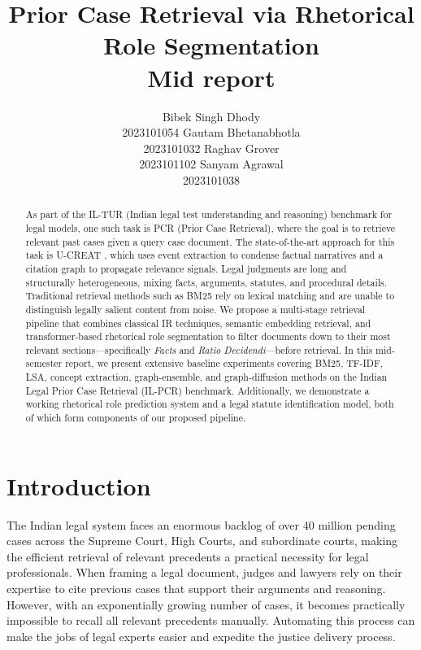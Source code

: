 \documentclass[11pt]{article}
\title{Prior Case Retrieval via Rhetorical Role Segmentation\\Mid report}
\author{
  Bibek Singh Dhody \\ 2023101054 \And
  Gautam Bhetanabhotla \\ 2023101032 \And
  Raghav Grover \\ 2023101102 \And
  Sanyam Agrawal \\ 2023101038
}
\begin{document}
\maketitle

\begin{abstract}
As part of the IL-TUR (Indian legal test understanding and reasoning) benchmark for legal models, one such task is PCR (Prior Case Retrieval), where the goal is to retrieve relevant past cases given a query case document.
The state-of-the-art approach for this task is U-CREAT \cite{joshi2023ucreat}, which uses event extraction to condense factual narratives and a citation graph to propagate relevance signals.
Legal judgments are long and structurally heterogeneous, mixing facts, arguments, statutes, and procedural details.
Traditional retrieval methods such as BM25 rely on lexical matching and are unable to distinguish legally salient content from noise.
We propose a multi-stage retrieval pipeline that combines classical IR techniques, semantic embedding retrieval, and transformer-based rhetorical role segmentation to filter documents down to their most relevant sections---specifically \emph{Facts} and \emph{Ratio Decidendi}---before retrieval.
In this mid-semester report, we present extensive baseline experiments covering BM25, TF-IDF, LSA, concept extraction, graph-ensemble, and graph-diffusion methods on the Indian Legal Prior Case Retrieval (IL-PCR) benchmark.
Additionally, we demonstrate a working rhetorical role prediction system and a legal statute identification model, both of which form components of our proposed pipeline.
\end{abstract}

\section{Introduction}

The Indian legal system faces an enormous backlog of over 40 million pending cases across the Supreme Court, High Courts, and subordinate courts, making the efficient retrieval of relevant precedents a practical necessity for legal professionals.
When framing a legal document, judges and lawyers rely on their expertise to cite previous cases that support their arguments and reasoning.
However, with an exponentially growing number of cases, it becomes practically impossible to recall all relevant precedents manually.
Automating this process can make the jobs of legal experts easier and expedite the justice delivery process.
\end{document}

